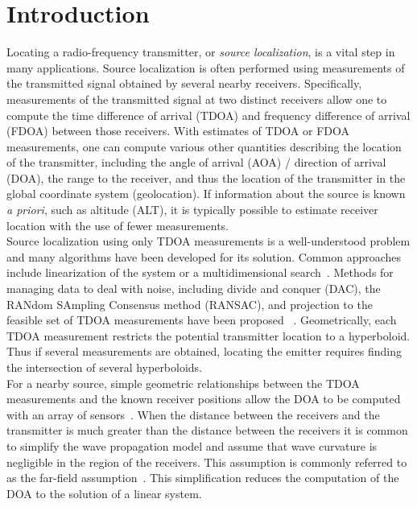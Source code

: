 \section{Introduction}
\label{s:intro}
Locating a radio-frequency transmitter, or \emph{source localization}, is a vital step in many applications. Source localization is often performed using measurements of the transmitted signal obtained by several nearby receivers. Specifically, measurements of the transmitted signal at two distinct receivers allow one to compute the time difference of arrival (TDOA) and frequency difference of arrival (FDOA) between those receivers. With estimates of TDOA or FDOA measurements, one can compute various other quantities describing the location of the transmitter, including the angle of arrival (AOA) / direction of arrival (DOA), the range to the receiver, and thus the location of the transmitter in the global coordinate system (geolocation). If information about the source is known {\em a priori}, such as altitude (ALT), it is typically possible to estimate receiver location with the use of fewer measurements.\\

Source localization using only TDOA measurements is a well-understood problem and many algorithms have been developed for its solution. Common approaches include linearization of the system or a multidimensional search~\cite{Torrieri1984}. Methods for managing data to deal with noise, including divide and conquer (DAC), the RANdom SAmpling Consensus method (RANSAC), and projection to the feasible set of TDOA measurements have been proposed ~\cite{Cameron,Abel1990,Li2009,Compagnoni2017}. Geometrically, each TDOA measurement restricts the potential transmitter location to a hyperboloid. Thus if several measurements are obtained, locating the emitter requires finding the intersection of several hyperboloids. \\

For a nearby source, simple geometric relationships between the TDOA measurements and the known receiver positions allow the DOA to be computed with an array of sensors~\cite{Benesty2008}. When the distance between the receivers and the transmitter is much greater than the distance between the receivers it is common to simplify the wave propagation model and assume that wave curvature is negligible in the region of the receivers. This assumption is commonly referred to as the far-field assumption~\cite{Cheney2009}. This simplification reduces the computation of the DOA to the solution of a linear system. \\

